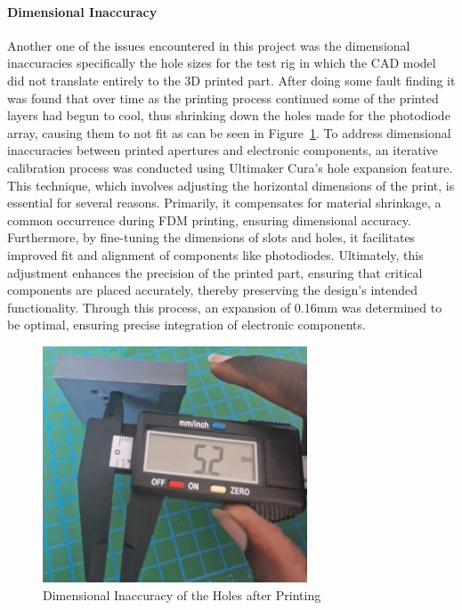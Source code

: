 \paragraph{Dimensional Inaccuracy}

Another one of the issues encountered in this project was the dimensional inaccuracies specifically the hole sizes for the test rig in which the CAD model did not translate entirely to the 3D printed part.  
After doing some fault finding it was found that over time as the printing process continued some of the printed layers had begun to cool, thus shrinking down the holes made for the photodiode array, causing them to not fit as can be seen in Figure~\ref{fig:DimInaccuracy}.  
To address dimensional inaccuracies between printed apertures and electronic components, an iterative calibration process was conducted using Ultimaker Cura's hole expansion feature. 
This technique, which involves adjusting the horizontal dimensions of the print, is essential for several reasons. 
Primarily, it compensates for material shrinkage, a common occurrence during FDM printing, ensuring dimensional accuracy. 
Furthermore, by fine-tuning the dimensions of slots and holes, it facilitates improved fit and alignment of components like photodiodes. 
Ultimately, this adjustment enhances the precision of the printed part, ensuring that critical components are placed accurately, thereby preserving the design's intended functionality. 
Through this process, an expansion of 0.16mm was determined to be optimal, ensuring precise integration of electronic components.

\begin{figure}[H]
    \centering
    \includegraphics[width=0.7\textwidth]{figures/CAD-3DPrint/WrongDimensions.jpg}
    \caption{Dimensional Inaccuracy of the Holes after Printing}
    \label{fig:DimInaccuracy}
    
   
    
\end{figure}
%
%

